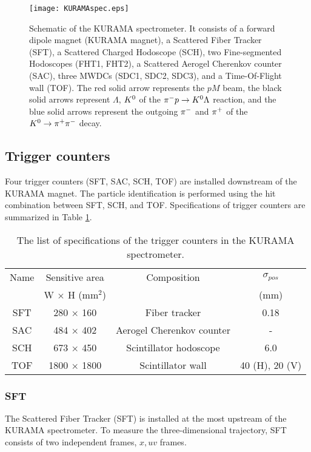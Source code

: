 \begin{figure}[!h]
 \begin{center}
   \texttt{[image: KURAMAspec.eps]}
   \caption{Schematic of the KURAMA spectrometer. It consists of a forward dipole magnet (KURAMA magnet), a Scattered Fiber Tracker (SFT), a Scattered Charged Hodoscope (SCH), two Fine-segmented Hodoscopes (FHT1, FHT2), a Scattered Aerogel Cherenkov counter (SAC), three MWDCs (SDC1, SDC2, SDC3), and a Time-Of-Flight wall (TOF). The red solid arrow represents the $pM$ beam, the black solid arrows represent $\Lambda$, $K^{0}$ of the $\pi^- p \to K^0 \Lambda$ reaction, and the blue solid arrows represent the outgoing $\pi^{-}$ and $\pi^{+}$ of the $K^0 \to \pi^+ \pi^-$ decay.}
   \label{fig-KURAMAspec}
 \end{center}
\end{figure}

%
\subsection{Trigger counters}
Four trigger counters (SFT, SAC, SCH, TOF) are installed downstream of the KURAMA magnet. The particle identification is performed using the hit combination between SFT, SCH, and TOF. Specifications of trigger counters are summarized in Table \ref{tab-KURAMAspec-trig}.

\begin{table}[h]
  \begin{center}
    \caption{The list of specifications of the trigger counters in the KURAMA spectrometer.}
    \begin{tabular}{cccc}
      Name & Sensitive area & Composition & $\sigma_{pos}$ \\
       & W $\times$ H (mm$^2$) & & (mm) \\ \hline \hline
      SFT& 280 $\times$ 160 & Fiber tracker & 0.18  \\
      SAC& 484 $\times$ 402 & Aerogel Cherenkov counter & -  \\
      SCH & 673 $\times$ 450 & Scintillator hodoscope & 6.0  \\ 
      TOF & 1800 $\times$ 1800 & Scintillator wall & 40 (H), 20 (V)  \\ 
   \end{tabular}
   \label{tab-KURAMAspec-trig}
   \end{center}
\end{table}

%
\subsubsection{SFT}
The Scattered Fiber Tracker (SFT) is installed at the most upstream of the KURAMA spectrometer. To measure the three-dimensional trajectory, SFT consists of two independent frames, $x, uv$ frames.

